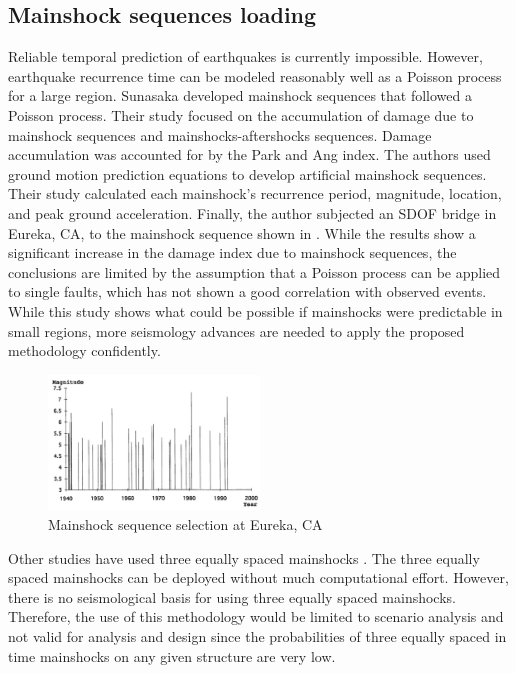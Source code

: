 \subsection{Mainshock sequences loading}

Reliable temporal prediction of earthquakes is currently impossible. However, earthquake recurrence time can be modeled reasonably well as a Poisson process for a large region. Sunasaka \cite{Sunasaka1993} developed mainshock sequences that followed a Poisson process. Their study focused on the accumulation of damage due to mainshock sequences and mainshocks-aftershocks sequences. Damage accumulation was accounted for by the Park and Ang index. The authors used ground motion prediction equations to develop artificial mainshock sequences. Their study calculated each mainshock's recurrence period, magnitude, location, and peak ground acceleration. Finally, the author subjected an SDOF bridge in Eureka, CA, to the mainshock sequence shown in   . While the results show a significant increase in the damage index due to mainshock sequences, the conclusions are limited by the assumption that a Poisson process can be applied to single faults, which has not shown a good correlation with observed events\cite{Shearer2009}. While this study shows what could be possible if mainshocks were predictable in small regions, more seismology advances are needed to apply the proposed methodology confidently.

\begin{figure}[htbp]
\centering
\includegraphics[width=0.5\textwidth]{Chapter-2/figs/Mainshock_sequence_01}
\caption{Mainshock sequence selection at Eureka, CA \cite{Sunasaka1993}}
\label{fig:MS-MS_Sunasaka}
\end{figure}

Other studies have used three equally spaced mainshocks \cite{Hatzigeorgiou2009}. The three equally spaced mainshocks can be deployed without much computational effort. However, there is no seismological basis for using three equally spaced mainshocks. Therefore, the use of this methodology would be limited to scenario analysis and not valid for analysis and design since the probabilities of three equally spaced in time mainshocks on any given structure are very low.

